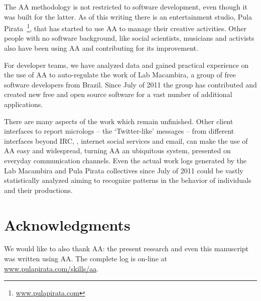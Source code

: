 \documentclass[letterpaper]{article}
\begin{document}
The AA methodology is not restricted to software development, even though it was
built for the latter. As of this
writing there is an entertainment studio, Pula Pirata~\footnote{
\url{www.pulapirata.com}}, that has started to use AA to manage their creative activities.
Other people with no software background, like social scientists, musicians and
activists also have been using AA and contributing for its improvement.

For developer teams, we have analyzed data and gained practical experience on
the use of AA to auto-regulate the work of Lab Macambira, a group of free
software developers from Brazil. Since July of 2011 the group has contributed
and created new free and open source software for a vast number of additional applications.

There are many aspects of the work which remain unfinished. Other client
interfaces to report micrologs -- the `Twitter-like' messages -- from different
interfaces beyond IRC, \eg, internet social services and email, can make the use of
AA easy and widespread, turning AA an ubiquitous system, presented on everyday
communication channels. Even the actual work logs generated by the Lab Macambira
and Pula Pirata collectives since July of 2011 could be
vastly statistically analyzed aiming to recognize patterns in the behavior of
individuals and their productions.

\section*{Acknowledgments}

We would like to also thank AA: the present research and even this
manuscript was written using AA. The complete log is on-line at
\url{www.pulapirata.com/skills/aa}.


\nocite{last2003}
\nocite{german2003}
\nocite{carmel1999}
\nocite{carmel2001}
\nocite{komi2005}
\nocite{battin2001}

%
%


\end{document}
